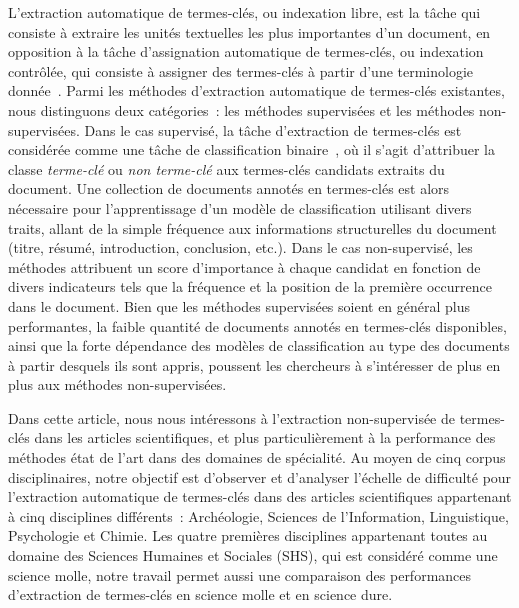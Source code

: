   L'extraction automatique de termes-clés, ou indexation libre, est la tâche qui
  consiste à extraire les unités textuelles les plus importantes d'un document,
  en opposition à la tâche d'assignation automatique de termes-clés, ou
  indexation contrôlée, qui consiste à assigner des termes-clés à partir d'une
  terminologie donnée~\cite{paroubek2012deft}. Parmi les méthodes d'extraction
  automatique de termes-clés existantes, nous distinguons deux catégories~: les
  méthodes supervisées et les méthodes non-supervisées. Dans le cas supervisé,
  la tâche d'extraction de termes-clés est considérée comme une tâche de
  classification binaire~\cite{witten1999kea}, où il s'agit d'attribuer la
  classe \og{}\textit{terme-clé}\fg{} ou \og{}\textit{non terme-clé}\fg{} aux
  termes-clés candidats extraits du document. Une collection de documents
  annotés en termes-clés est alors nécessaire pour l'apprentissage d'un modèle
  de classification utilisant divers traits, allant de la simple fréquence aux
  informations structurelles du document (titre, résumé, introduction,
  conclusion, etc.). Dans le cas non-supervisé, les méthodes attribuent un
  score d'importance à chaque candidat en fonction de divers indicateurs tels
  que la fréquence et la position de la première occurrence dans le document.
  Bien que les méthodes supervisées soient en général plus performantes, la
  faible quantité de documents annotés en termes-clés disponibles, ainsi que la
  forte dépendance des modèles de classification au type des documents à partir
  desquels ils sont appris, poussent les chercheurs à s'intéresser de plus en
  plus aux méthodes non-supervisées.

  Dans cette article, nous nous intéressons à l'extraction non-supervisée de
  termes-clés dans les articles scientifiques, et plus particulièrement à la
  performance des méthodes état de l'art dans des domaines de spécialité. Au
  moyen de cinq corpus disciplinaires, notre objectif est d'observer et
  d'analyser l'échelle de difficulté pour l'extraction automatique de
  termes-clés dans des articles scientifiques appartenant à cinq disciplines
  différents~: Archéologie, Sciences de l'Information, Linguistique, Psychologie
  et Chimie. Les quatre premières disciplines appartenant toutes au domaine des
  Sciences Humaines et Sociales (SHS), qui est considéré comme une science
  molle, notre travail permet aussi une comparaison des performances
  d'extraction de termes-clés en science molle et en science dure.

